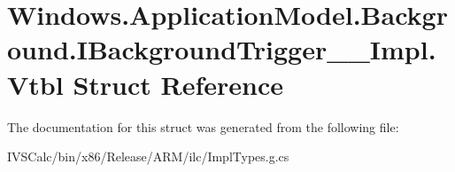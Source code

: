 \hypertarget{struct_windows_1_1_application_model_1_1_background_1_1_i_background_trigger_____impl_1_1_vtbl}{}\section{Windows.\+Application\+Model.\+Background.\+I\+Background\+Trigger\+\_\+\+\_\+\+Impl.\+Vtbl Struct Reference}
\label{struct_windows_1_1_application_model_1_1_background_1_1_i_background_trigger_____impl_1_1_vtbl}


The documentation for this struct was generated from the following file\+:\begin{DoxyCompactItemize}
\item 
I\+V\+S\+Calc/bin/x86/\+Release/\+A\+R\+M/ilc/Impl\+Types.\+g.\+cs\end{DoxyCompactItemize}
